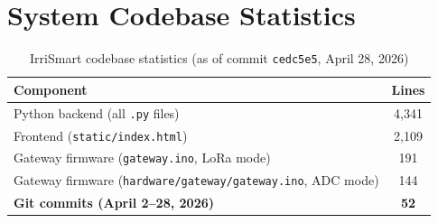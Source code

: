 \documentclass[12pt,a4paper]{report}
\begin{document}
\section{System Codebase Statistics}

\begin{table}[H]
\centering
\caption{IrriSmart codebase statistics (as of commit \texttt{cedc5e5}, April 28, 2026)}
\label{tab:code}
\begin{tabular}{lc}
\toprule
\textbf{Component} & \textbf{Lines} \\
\midrule
Python backend (all \texttt{.py} files) & 4,341 \\
Frontend (\texttt{static/index.html}) & 2,109 \\
Gateway firmware (\texttt{gateway.ino}, LoRa mode) & 191 \\
Gateway firmware (\texttt{hardware/gateway/gateway.ino}, ADC mode) & 144 \\
\midrule
\textbf{Git commits (April 2--28, 2026)} & \textbf{52} \\
\bottomrule
\end{tabular}
\end{table}
\end{document}
